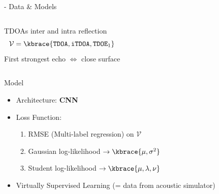 \begin{frame}{\lantern - Data \& Models}
\begin{block}{}
\begin{columns}[T,onlytextwidth]

            \centering
            TDOAs inter and intra reflection
            \begin{equation*}
                \mathcal{V} = \kbrace{\mathtt{TDOA}, \mathtt{iTDOA}, \mathtt{TDOE}_1}
        \end{equation*}
        \textcolor{myred}{First strongest echo $\Leftrightarrow$ close surface}
        \end{columns}
    \end{block}

    \pause
    \begin{block}{Model}
        \begin{itemize}
            \item Architecture: \textbf{CNN}~{\small\cite{chakrabarty2017broadband,nguyen2018autonomous}}

            \pause
            \item Loss Function:
            \begin{enumerate}
                \item RMSE (Multi-label regression) on $\mathcal{V}$
                \item Gaussian log-likelihood $\to \kbrace{\mu, \sigma^2}$\hspace{.8em}
                \item Student log-likelihood $\to \kbrace{\mu, \lambda, \nu}$
            \end{enumerate}

            \pause
            \item Virtually Supervised Learning (= data from acoustic simulator)
        \end{itemize}

    \end{block}

    \pause

\end{frame}


